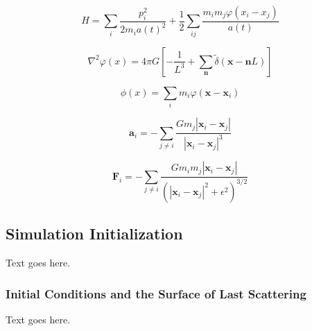 \begin{equation}
	H = \sum_{i} \frac{p_{i}^{2}}{2 m_{i} a(t)^{2}} + \frac{1}{2} \sum_{ij} \frac{m_{i} m_{j} \varphi(x_{i} - x_{j})}{a(t)}
\end{equation}

\begin{equation}
	\nabla^{2} \varphi(x) = 4 \pi G \left[ -\frac{1}{L^{3}} + \sum_{\mathbf{n}} \tilde{\delta}(\mathbf{x} - \mathbf{n}L) \right]
\end{equation}

\begin{equation}
	\phi(x) = \sum_{i} m_{i} \varphi(\mathbf{x} - \mathbf{x}_{i})
\end{equation}

\begin{equation}
	\mathbf{a}_{i} = -\sum_{j \ne i} \frac{G m_{j} | \mathbf{x}_{i} - \mathbf{x}_{j} |}{| \mathbf{x}_{i} - \mathbf{x}_{j} |^{3}}
\end{equation}

\begin{equation}
	\mathbf{F}_{i} = -\sum_{j \ne i} \frac{G m_{i} m_{j} | \mathbf{x}_{i} - \mathbf{x}_{j} |}{(| \mathbf{x}_{i} - \mathbf{x}_{j} |^{2} + \epsilon^{2})^{3/2}}
\end{equation}




\subsection{Simulation Initialization}
\label{subsec:computational_theory--simulation_initialization}


Text goes here.



\subsubsection{Initial Conditions and the Surface of Last Scattering}
\label{subsubsec:computational_theory--simulation_initialization--initial_conditions}


Text goes here.



